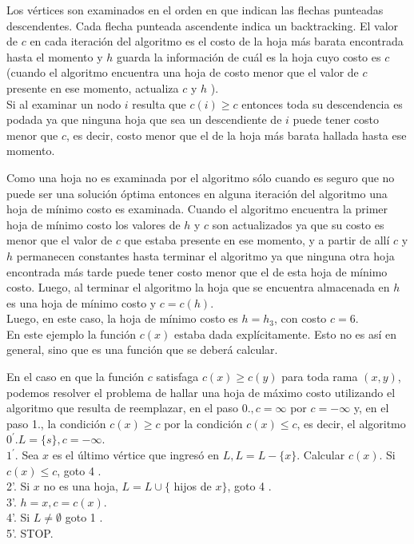 \documentclass[10pt]{article}
\begin{document}
Los vértices son examinados en el orden en que indican las flechas punteadas descendentes. Cada flecha punteada ascendente indica un backtracking. El valor de $c$ en cada iteración del algoritmo es el costo de la hoja más barata encontrada hasta el momento y $h$ guarda la información de cuál es la hoja cuyo costo es $c$ (cuando el algoritmo encuentra una hoja de costo menor que el valor de $c$ presente en ese momento, actualiza $c$ y $h$ ).\\
Si al examinar un nodo $i$ resulta que $c(i) \geq c$ entonces toda su descendencia es podada ya que ninguna hoja que sea un descendiente de $i$ puede tener costo menor que $c$, es decir, costo menor que el de la hoja más barata hallada hasta ese momento.

Como una hoja no es examinada por el algoritmo sólo cuando es seguro que no puede ser una solución óptima entonces en alguna iteración del algoritmo una hoja de mínimo costo es examinada. Cuando el algoritmo encuentra la primer hoja de mínimo costo los valores de $h$ y $c$ son actualizados ya que su costo es menor que el valor de $c$ que estaba presente en ese momento, y a partir de allí $c$ y $h$ permanecen constantes hasta terminar el algoritmo ya que ninguna otra hoja encontrada más tarde puede tener costo menor que el de esta hoja de mínimo costo. Luego, al terminar el algoritmo la hoja que se encuentra almacenada en $h$ es una hoja de mínimo costo y $c=c(h)$.\\
Luego, en este caso, la hoja de mínimo costo es $h=h_{3}$, con costo $c=6$.\\
En este ejemplo la función $c(x)$ estaba dada explícitamente. Esto no es así en general, sino que es una función que se deberá calcular.

En el caso en que la función $c$ satisfaga $c(x) \geq c(y)$ para toda rama $(x, y)$, podemos resolver el problema de hallar una hoja de máximo costo utilizando el algoritmo que resulta de reemplazar, en el paso $0 ., c=\infty$ por $c=-\infty$ y, en el paso 1., la condición $c(x) \geq c$ por la condición $c(x) \leq c$, es decir, el algoritmo\\
$0^{\prime} . L=\{s\}, c=-\infty$.\\
$1^{\prime}$. Sea $x$ es el último vértice que ingresó en $L, L=L-\{x\}$. Calcular $c(x)$. Si $c(x) \leq c$, goto 4 .\\
2'. Si $x$ no es una hoja, $L=L \cup\{$ hijos de $x\}$, goto 4 .\\
3'. $h=x, c=c(x)$.\\
4'. Si $L \neq \emptyset$ goto 1 .\\
5'. STOP.
\end{document}
